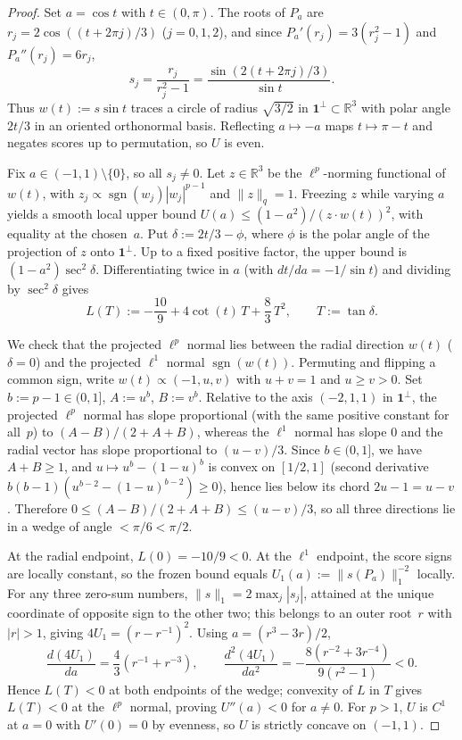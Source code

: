 \documentclass[11pt]{article}
\theoremstyle{plain}
\theoremstyle{definition}
\theoremstyle{remark}
\DeclareMathOperator{\sgn}{sgn}
\newcommand{\one}{\mathbf{1}}
\begin{document}
\begin{proof}
Set $a = \cos t$ with $t \in (0,\pi)$. The roots of $P_a$ are $r_j = 2\cos((t + 2\pi j)/3)$ ($j = 0,1,2$), and since $P_a'(r_j) = 3(r_j^2 - 1)$ and $P_a''(r_j) = 6 r_j$,
\[
s_j = \frac{r_j}{r_j^2 - 1} = \frac{\sin(2(t + 2\pi j)/3)}{\sin t}.
\]
Thus $w(t) := s \sin t$ traces a circle of radius $\sqrt{3/2}$ in $\one^\perp \subset \mathbb{R}^3$ with polar angle $2t/3$ in an oriented orthonormal basis. Reflecting $a \mapsto -a$ maps $t \mapsto \pi - t$ and negates scores up to permutation, so $U$ is even.

Fix $a \in (-1,1) \setminus \{0\}$, so all $s_j \neq 0$. Let $z \in \mathbb{R}^3$ be the $\ell^p$-norming functional of $w(t)$, with $z_j \propto \sgn(w_j)|w_j|^{p-1}$ and $\|z\|_q = 1$. Freezing $z$ while varying $a$ yields a smooth local upper bound $U(a) \le (1-a^2)/(z \cdot w(t))^2$, with equality at the chosen~$a$. Put $\delta := 2t/3 - \phi$, where $\phi$ is the polar angle of the projection of $z$ onto $\one^\perp$. Up to a fixed positive factor, the upper bound is $(1-a^2)\sec^2 \delta$. Differentiating twice in $a$ (with $dt/da = -1/\sin t$) and dividing by $\sec^2 \delta$ gives
\[
L(T) := -\frac{10}{9} + 4\cot(t)\, T + \frac{8}{3}\, T^2, \qquad T := \tan \delta.
\]

We check that the projected $\ell^p$ normal lies between the radial direction $w(t)$ ($\delta = 0$) and the projected $\ell^1$ normal $\sgn(w(t))$. Permuting and flipping a common sign, write $w(t) \propto (-1, u, v)$ with $u + v = 1$ and $u \ge v > 0$. Set $b := p - 1 \in (0,1]$, $A := u^b$, $B := v^b$. Relative to the axis $(-2,1,1)$ in $\one^\perp$, the projected $\ell^p$ normal has slope proportional (with the same positive constant for all~$p$) to $(A-B)/(2+A+B)$, whereas the $\ell^1$ normal has slope $0$ and the radial vector has slope proportional to $(u-v)/3$. Since $b \in (0,1]$, we have $A + B \ge 1$, and $u \mapsto u^b - (1-u)^b$ is convex on $[1/2,1]$ (second derivative $b(b-1)(u^{b-2} - (1-u)^{b-2}) \ge 0$), hence lies below its chord $2u - 1 = u - v$. Therefore $0 \le (A-B)/(2+A+B) \le (u-v)/3$, so all three directions lie in a wedge of angle $< \pi/6 < \pi/2$.

At the radial endpoint, $L(0) = -10/9 < 0$. At the $\ell^1$ endpoint, the score signs are locally constant, so the frozen bound equals $U_1(a) := \|s(P_a)\|_1^{-2}$ locally. For any three zero-sum numbers, $\|s\|_1 = 2\max_j |s_j|$, attained at the unique coordinate of opposite sign to the other two; this belongs to an outer root~$r$ with $|r| > 1$, giving $4 U_1 = (r - r^{-1})^2$. Using $a = (r^3 - 3r)/2$,
\[
\frac{d(4U_1)}{da} = \frac{4}{3}(r^{-1} + r^{-3}),
\qquad
\frac{d^2(4U_1)}{da^2} = -\frac{8(r^{-2} + 3r^{-4})}{9(r^2 - 1)} < 0.
\]
Hence $L(T) < 0$ at both endpoints of the wedge; convexity of $L$ in $T$ gives $L(T) < 0$ at the $\ell^p$ normal, proving $U''(a) < 0$ for $a \neq 0$. For $p > 1$, $U$ is $C^1$ at $a = 0$ with $U'(0) = 0$ by evenness, so $U$ is strictly concave on $(-1,1)$.


\end{proof}
\end{document}
